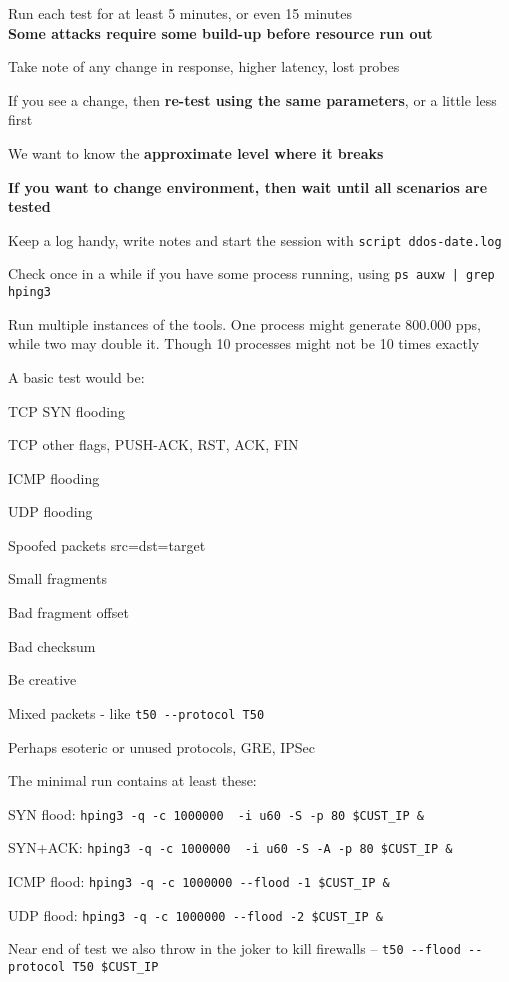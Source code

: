 \documentclass[Screen16to9,17pt]{foils}
\begin{document}
\begin{list2}
\item Run each test for at least 5 minutes, or even 15 minutes\\
{\bf Some attacks require some build-up before resource run out}
\item Take note of any change in response, higher latency, lost probes
\item If you see a change, then {\bf re-test using the same parameters}, or a little less first
\item We want to know the {\bf approximate level where it breaks}
\item {\bf If you want to change environment, then wait until all scenarios are tested}
\item Keep a log handy, write notes and start the session with \verb+script ddos-date.log+
\item Check once in a while if you have some process running, using \verb+ps auxw | grep hping3+
\item Run multiple instances of the tools. One process might generate 800.000 pps, while two may double it. Though 10 processes might not be 10 times exactly
\end{list2}




A basic test would be:
\begin{list2}
\item TCP SYN flooding
\item TCP other flags, PUSH-ACK, RST, ACK, FIN
\item ICMP flooding
\item UDP flooding
\item Spoofed packets src=dst=target \smiley
\item Small fragments
\item Bad fragment offset
\item Bad checksum
\item Be creative
\item Mixed packets - like \verb+t50 --protocol T50+
\item Perhaps esoteric or unused protocols, GRE, IPSec
\end{list2}


The minimal run contains at least these:
\begin{list2}
\item SYN flood: \verb+hping3 -q -c 1000000  -i u60 -S -p 80 $CUST_IP &+
\item SYN+ACK: \verb+hping3 -q -c 1000000  -i u60 -S -A -p 80 $CUST_IP &+
\item ICMP flood: \verb+hping3 -q -c 1000000 --flood -1 $CUST_IP &+
\item UDP flood: \verb+hping3 -q -c 1000000 --flood -2 $CUST_IP &+
\item Near end of test we also throw in the joker to kill firewalls -- \verb+t50 --flood --protocol T50 $CUST_IP+
\end{list2}
\end{document}
